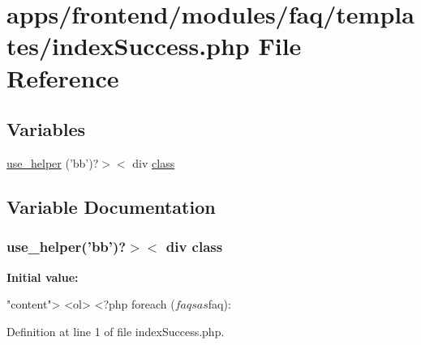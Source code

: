 \hypertarget{frontend_2modules_2faq_2templates_2index_success_8php}{\section{apps/frontend/modules/faq/templates/index\-Success.php File Reference}
\label{frontend_2modules_2faq_2templates_2index_success_8php}
}
\subsection*{Variables}
\begin{DoxyCompactItemize}
\item 
\hyperlink{frontend_2modules_2faq_2templates_2index_success_8php_ad20740d877696f45a78b0497ff807965}{use\-\_\-helper} ('bb')?$>$$<$ div \hyperlink{live_2modules_2news_2templates_2__actualitelight_8php_a185c73c6507391d1eb38c776b68ce96d}{class}
\end{DoxyCompactItemize}


\subsection{Variable Documentation}
\hypertarget{frontend_2modules_2faq_2templates_2index_success_8php_ad20740d877696f45a78b0497ff807965}{
\subsubsection[{use\-\_\-helper}]{\setlength{\rightskip}{0pt plus 5cm}use\-\_\-helper('bb')?$>$$<$ div {\bf class}}}\label{frontend_2modules_2faq_2templates_2index_success_8php_ad20740d877696f45a78b0497ff807965}
{\bfseries Initial value\-:}
\begin{DoxyCode}
\textcolor{stringliteral}{"content"}>
        <ol>
        <?php \textcolor{keywordflow}{foreach} ($faqs as $faq):
\end{DoxyCode}


Definition at line 1 of file index\-Success.\-php.

